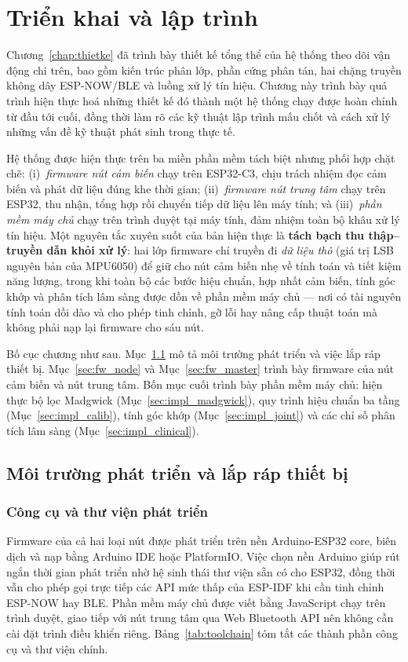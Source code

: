 \documentclass[../DoAn.tex]{subfiles}
\begin{document}
\chapter{Triển khai và lập trình}
\label{chap:trienkhai}

Chương~\ref{chap:thietke} đã trình bày thiết kế tổng thể của hệ thống theo dõi vận động chi trên, bao gồm kiến trúc phân lớp, phần cứng phân tán, hai chặng truyền không dây ESP-NOW/BLE và luồng xử lý tín hiệu. Chương này trình bày quá trình hiện thực hoá những thiết kế đó thành một hệ thống chạy được hoàn chỉnh từ đầu tới cuối, đồng thời làm rõ các kỹ thuật lập trình mấu chốt và cách xử lý những vấn đề kỹ thuật phát sinh trong thực tế.

Hệ thống được hiện thực trên ba miền phần mềm tách biệt nhưng phối hợp chặt chẽ: (i)~\emph{firmware nút cảm biến} chạy trên ESP32-C3, chịu trách nhiệm đọc cảm biến và phát dữ liệu đúng khe thời gian; (ii)~\emph{firmware nút trung tâm} chạy trên ESP32, thu nhận, tổng hợp rồi chuyển tiếp dữ liệu lên máy tính; và (iii)~\emph{phần mềm máy chủ} chạy trên trình duyệt tại máy tính, đảm nhiệm toàn bộ khâu xử lý tín hiệu. Một nguyên tắc xuyên suốt của bản hiện thực là \textbf{tách bạch thu thập--truyền dẫn khỏi xử lý}: hai lớp firmware chỉ truyền đi \emph{dữ liệu thô} (giá trị LSB nguyên bản của MPU6050) để giữ cho nút cảm biến nhẹ về tính toán và tiết kiệm năng lượng, trong khi toàn bộ các bước hiệu chuẩn, hợp nhất cảm biến, tính góc khớp và phân tích lâm sàng được dồn về phần mềm máy chủ --- nơi có tài nguyên tính toán dồi dào và cho phép tinh chỉnh, gỡ lỗi hay nâng cấp thuật toán mà không phải nạp lại firmware cho sáu nút.

Bố cục chương như sau. Mục~\ref{sec:moitruong} mô tả môi trường phát triển và việc lắp ráp thiết bị. Mục~\ref{sec:fw_node} và Mục~\ref{sec:fw_master} trình bày firmware của nút cảm biến và nút trung tâm. Bốn mục cuối trình bày phần mềm máy chủ: hiện thực bộ lọc Madgwick (Mục~\ref{sec:impl_madgwick}), quy trình hiệu chuẩn ba tầng (Mục~\ref{sec:impl_calib}), tính góc khớp (Mục~\ref{sec:impl_joint}) và các chỉ số phân tích lâm sàng (Mục~\ref{sec:impl_clinical}).

\section{Môi trường phát triển và lắp ráp thiết bị}
\label{sec:moitruong}

\subsection{Công cụ và thư viện phát triển}
Firmware của cả hai loại nút được phát triển trên nền Arduino-ESP32 core, biên dịch và nạp bằng Arduino IDE hoặc PlatformIO. Việc chọn nền Arduino giúp rút ngắn thời gian phát triển nhờ hệ sinh thái thư viện sẵn có cho ESP32, đồng thời vẫn cho phép gọi trực tiếp các API mức thấp của ESP-IDF khi cần tinh chỉnh ESP-NOW hay BLE. Phần mềm máy chủ được viết bằng JavaScript chạy trên trình duyệt, giao tiếp với nút trung tâm qua Web Bluetooth API nên không cần cài đặt trình điều khiển riêng. Bảng~\ref{tab:toolchain} tóm tắt các thành phần công cụ và thư viện chính.
\end{document}
